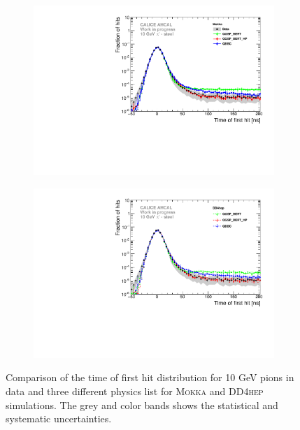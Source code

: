 \documentclass{JINST}
\newcommand\mokka{\textsc{Mokka}\xspace}
\newcommand\ddhep{\textsc{DD4hep}\xspace}
\begin{document}
\begin{figure}[htbp!]
	\centering
	\begin{subfigure}[t]{0.49\textwidth}
		\includegraphics[width=1\textwidth]{fig/Comparison_SimData_Pion10GeV_LateClusters.pdf}
		\caption{}\label{fig:dNdt_SimData_10GeV}
	\end{subfigure}
	\hfill
	\begin{subfigure}[t]{0.49\textwidth}
		\includegraphics[width=1\textwidth]{fig/Comparison_SimData_Pion10GeV_LateClusters_DD4hep.pdf}
		\caption{}\label{fig:dNdt_SimData_10GeV_DD4hep}
	\end{subfigure}
	\caption{Comparison of the time of first hit distribution for 10 GeV pions in data and three different physics list for \mokka and \ddhep simulations. The grey and color bands shows the statistical and systematic uncertainties.}
	\label{fig:dNdt_SimData_10GeV_all}
\end{figure}
\end{document}
